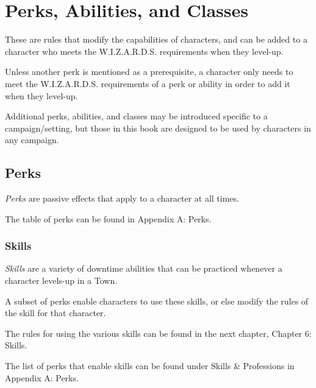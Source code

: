 
\chapter{Perks, Abilities, and Classes}
These are rules that modify the capabilities of characters,
and can be added to a character who meets the W.I.Z.A.R.D.S. requirements when they level-up.

\vspace{0.4em}

Unless another perk is mentioned as a prerequisite, 
a character only needs to meet the W.I.Z.A.R.D.S. requirements of a perk or ability
in order to add it when they level-up.

\begin{DesignerNote}
  Additional perks, abilities, and classes may be introduced specific to a campaign/setting, 
  but those in this book are designed to be used by characters in any campaign.
\end{DesignerNote}




\section{Perks}
\textit{Perks} are passive effects that apply to a character at all times.

\vspace{0.4em}

The table of perks can be found in Appendix A: Perks.


\subsection{Skills}
\textit{Skills} are a variety of downtime abilities that can be practiced 
whenever a character levels-up in a Town.

\vspace{0.4em}

A subset of perks enable characters to use these skills, 
or else modify the rules of the skill for that character.

\vspace{0.4em}

The rules for using the various skills can be found in the next chapter, Chapter 6: Skills.

\vspace{0.4em}

The list of perks that enable skills can be found under Skills \& Professions in Appendix A: Perks.


